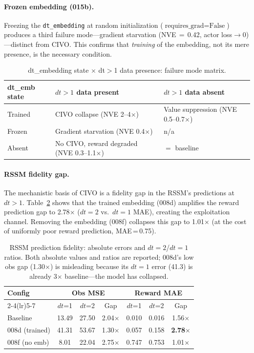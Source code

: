\documentclass[10pt,letterpaper]{article}
\begin{document}
\paragraph{Frozen embedding (015b).}
Freezing the \texttt{dt\_embedding} at random initialization ($\text{requires\_grad}=\text{False}$) produces a third failure mode---gradient starvation (NVE\,$=$\,0.42, actor loss$\to$0)---distinct from CIVO.
This confirms that \emph{training} of the embedding, not its mere presence, is the necessary condition.

\begin{table}[h]
\centering
\caption{dt\_embedding state $\times$ dt$>$1 data presence: failure mode matrix.}
\label{tab:2x2_matrix}
\small
\begin{tabular}{@{}lll@{}}
\toprule
dt\_emb state & $dt>1$ data present & $dt>1$ data absent \\
\midrule
Trained  & \textcolor{civo}{CIVO collapse (NVE 2--4$\times$)} & Value suppression (NVE 0.5--0.7$\times$) \\
Frozen   & Gradient starvation (NVE 0.4$\times$) & n/a \\
Absent   & No CIVO, reward degraded (NVE 0.3--1.1$\times$) & $=$ baseline \\
\bottomrule
\end{tabular}
\end{table}

\paragraph{RSSM fidelity gap.}
The mechanistic basis of CIVO is a fidelity gap in the RSSM's predictions at $dt>1$.
Table~\ref{tab:rssm_fidelity} shows that the trained embedding (008d) amplifies the reward prediction gap to 2.78$\times$ ($dt=2$ vs.\ $dt=1$ MAE), creating the exploitation channel.
Removing the embedding (008f) collapses this gap to 1.01$\times$ (at the cost of uniformly poor reward prediction, MAE\,=\,0.75).

\begin{table}[h]
\centering
\caption{RSSM prediction fidelity: absolute errors and $dt=2$/$dt=1$ ratios. Both absolute values and ratios are reported; 008d's low obs gap (1.30$\times$) is misleading because its $dt=1$ error (41.3) is already 3$\times$ baseline---the model has collapsed.}
\label{tab:rssm_fidelity}
\small
\begin{tabular}{@{}lcccccc@{}}
\toprule
Config & \multicolumn{3}{c}{Obs MSE} & \multicolumn{3}{c}{Reward MAE} \\
\cmidrule(lr){2-4}\cmidrule(lr){5-7}
 & $dt$=1 & $dt$=2 & Gap & $dt$=1 & $dt$=2 & Gap \\
\midrule
Baseline          & 13.49 & 27.50 & 2.04$\times$ & 0.010 & 0.016 & 1.56$\times$ \\
008d (trained)    & 41.31 & 53.67 & 1.30$\times$ & 0.057 & 0.158 & \textbf{2.78$\times$} \\
008f (no emb)     & 8.01  & 22.04 & 2.75$\times$ & 0.747 & 0.753 & 1.01$\times$ \\
\bottomrule
\end{tabular}
\end{table}
\end{document}
